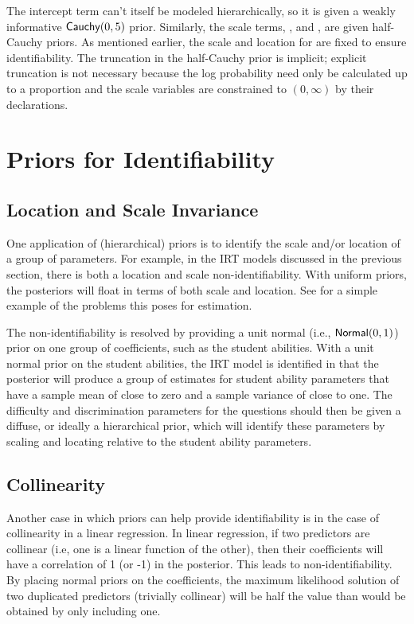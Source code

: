 The intercept term  can't itself be modeled
hierarchically, so it is given a weakly informative
$\mbox{\sf Cauchy}(0,5)$ prior.  Similarly, the scale terms,
, and , are given half-Cauchy
priors.  As mentioned earlier, the scale and location for 
are fixed to ensure identifiability.  The truncation in the
half-Cauchy prior is implicit; explicit truncation is not necessary
because the log probability need only be calculated up to a proportion
and the scale variables are constrained to $(0,\infty)$ by their
declarations.



\section{Priors for Identifiability}\label{priors-for-identification.section}

\subsection{Location and Scale Invariance}

One application of (hierarchical) priors is to identify the scale
and/or location of a group of parameters. For example, in the IRT
models discussed in the previous section, there is both a location and
scale non-identifiability.  With uniform priors, the posteriors will
float in terms of both scale and location.  See
 for a simple example of the problems this
poses for estimation.

The non-identifiability is resolved by providing a unit normal (i.e.,
$\mbox{\sf Normal}(0,1)$) prior on one group of coefficients, such as
the student abilities.  With a unit normal prior on the student
abilities, the IRT model is identified in that the posterior will
produce a group of estimates for student ability parameters that have
a sample mean of close to zero and a sample variance of close to one.
The difficulty and discrimination parameters for the questions should
then be given a diffuse, or ideally a hierarchical prior, which will
identify these parameters by scaling and locating relative to the
student ability parameters.

\subsection{Collinearity}

Another case in which priors can help provide identifiability is in
the case of collinearity in a linear regression.  In linear
regression, if two predictors are collinear (i.e, one is a linear
function of the other), then their coefficients will have a
correlation of 1 (or -1) in the posterior.  This leads to
non-identifiability.  By placing normal priors on the coefficients,
the maximum likelihood solution of two duplicated predictors (trivially
collinear) will be half the value than would be obtained by only
including one.

